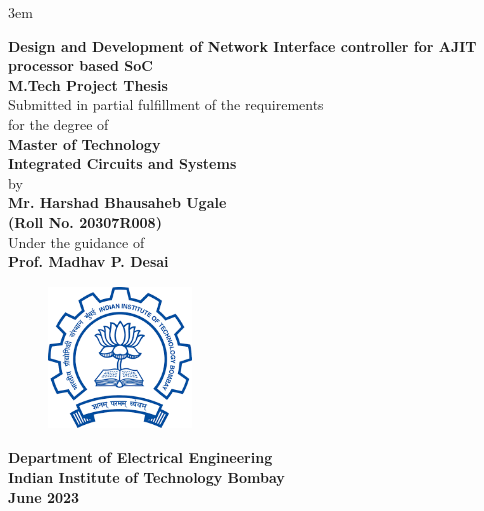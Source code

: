 \documentclass[a4paper,11pt, final]{report}
\begin{document}
	\emergencystretch 3em
  \thispagestyle{empty}
  \vspace*{1cm}
  {\centering     
  \textbf{\LARGE Design and Development of Network Interface controller for AJIT processor based SoC}\\
  \vspace{1.20cm}
  \textbf{\large M.Tech Project Thesis}\\
  \vspace{1cm}
  {Submitted in partial fulfillment of the requirements}\\
  \vspace{0.25cm}
  {for the degree of}\\
  \vspace{1cm}
  \textbf{ Master of Technology}\\
  \textbf{Integrated Circuits and Systems}\\
  \vspace{1.50cm}
  {by}\\
  \vspace{0.20cm}
  \textbf{\large Mr. Harshad Bhausaheb Ugale}\\
  \vspace{0.25cm}
  \textbf{\large (Roll No. 20307R008)}\\
  \vspace{1.8cm}
  {Under the guidance of}\\
  \vspace{0.20cm}
  \textbf{\large Prof. Madhav P. Desai}\\
    \vspace{0.30cm}
  \vspace{1.450cm}
    \begin{figure}[htb]
    \begin{center}
    \includegraphics[height=1.5in,width=1.5in]{logo.png}
    \end{center}
    \end{figure}

    
  {\textbf{Department of Electrical Engineering}}\\
  {\textbf{Indian Institute of Technology Bombay}}\\
  {\textbf{June 2023}}
 
 }
 
\end{document}
